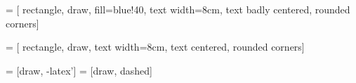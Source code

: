 \usepackage{tikz}
\usetikzlibrary{
	shapes,
    arrows,
    shapes.geometric,
    positioning,
}

 = [
	rectangle,
    draw,
    fill=blue!40,
    text width=8cm,
    text badly centered,
    rounded corners]

 = [
	rectangle,
	draw,
    text width=8cm,
    text centered,
    rounded corners]

 = [draw, -latex']
 = [draw, dashed]

